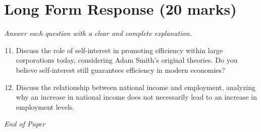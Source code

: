 \documentclass[12pt]{article}
\begin{document}
\section*{Long Form Response (20 marks)}
\textit{Answer each question with a clear and complete explanation.}
\begin{enumerate}[label=\arabic*.]
\setcounter{enumi}{10}
\item Discuss the role of self-interest in promoting efficiency within large corporations today, considering Adam Smith's original theories. Do you believe self-interest still guarantees efficiency in modern economies?
\item Discuss the relationship between national income and employment, analyzing why an increase in national income does not necessarily lead to an increase in employment levels.
\end{enumerate}

\vfill
\noindent\textit{End of Paper}
\end{document}

